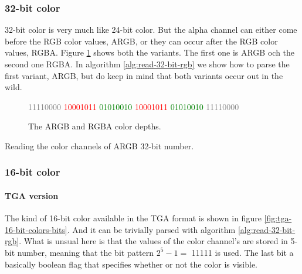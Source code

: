 \begin{refsection}
  \subsubsection{32-bit color}

  32-bit color is very much like 24-bit color. But the alpha channel
  can either come before the RGB color values, ARGB, or
  they can occur after the RGB color values, RGBA. Figure
  \ref{fig:32-bit-colors-bits} shows both the variants. The first one
  is ARGB och the second one RGBA. In algorithm
  \ref{alg:read-32-bit-rgb} we show how to parse the first variant,
  ARGB, but do keep in mind that both variants occur out in the wild.

  \begin{figure}
    \centering
    {\huge%
      \textcolor{gray}{11110000}%
      \textcolor{red}{10001011}%
      \textcolor{green}{01010010}%
      \textcolor{blue}{\fullbyte}}
    {\huge%
      \textcolor{red}{10001011}%
      \textcolor{green}{01010010}%
      \textcolor{blue}{\fullbyte}%
      \textcolor{gray}{11110000}%
    }

    \label{fig:32-bit-colors-bits}
    \caption{The ARGB and RGBA color depths.}
  \end{figure}

  \begin{algorithm}[H]
    \caption{Reading the color channels of ARGB 32-bit number.}
    \label{alg:read-32-bit-rgb}
    \begin{algorithmic}[1]
    \end{algorithmic}
  \end{algorithm}

  \subsubsection{16-bit color}

  \paragraph{TGA version}

  The kind of 16-bit color available in the TGA format is shown in
  figure \ref{fig:tga-16-bit-colors-bits}. And it can be trivially
  parsed with algorithm \ref{alg:read-32-bit-rgb}. What is unsual here is that the values of the
  color channel's are stored in 5-bit number, meaning that the bit
  pattern $2^5 - 1 =$  11111 is used. The last bit a basically boolean
  flag that specifies whether or not the color is visible.


\end{refsection}
